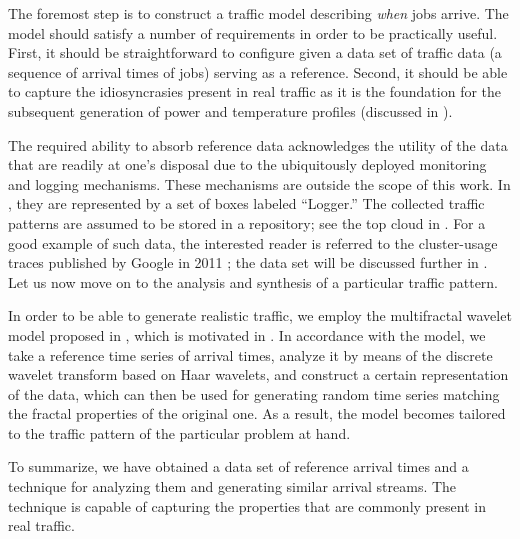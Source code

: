The foremost step is to construct a traffic model describing \emph{when} jobs
arrive. The model should satisfy a number of requirements in order to be
practically useful. First, it should be straightforward to configure given a
data set of traffic data (a sequence of arrival times of jobs) serving as a
reference. Second, it should be able to capture the idiosyncrasies present in
real traffic as it is the foundation for the subsequent generation of power and
temperature profiles (discussed in ).

The required ability to absorb reference data acknowledges the utility of the
data that are readily at one's disposal due to the ubiquitously deployed
monitoring and logging mechanisms. These mechanisms are outside the scope of
this work. In , they are represented by a set of boxes labeled
``Logger.'' The collected traffic patterns are assumed to be stored in a
repository; see the top cloud in . For a good example of such
data, the interested reader is referred to the cluster-usage traces published by
Google in 2011 \cite{reiss2011}; the data set will be discussed further in
. Let us now move on to the analysis and synthesis of a particular
traffic pattern.

In order to be able to generate realistic traffic, we employ the multifractal
wavelet model proposed in \cite{riedi1999}, which is motivated in
. In accordance with the model, we take a reference time series
of arrival times, analyze it by means of the discrete wavelet transform based on
Haar wavelets, and construct a certain representation of the data, which can
then be used for generating random time series matching the fractal properties
of the original one. As a result, the model becomes tailored to the traffic
pattern of the particular problem at hand.

To summarize, we have obtained a data set of reference arrival times and a
technique for analyzing them and generating similar arrival streams. The
technique is capable of capturing the properties that are commonly present in
real traffic.
